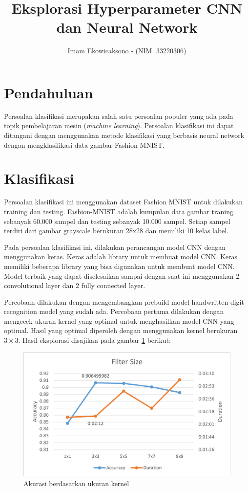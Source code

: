 \documentclass[a4, 12px]{article}
\title{Eksplorasi Hyperparameter CNN dan Neural Network}
\author{Imam Ekowicaksono -
  \small (NIM. 33220306)
}
\date{}
\theoremstyle{definition}
\theoremstyle{remark}
\begin{document}
\maketitle


\section{Pendahuluan}

Persoalan klasifikasi merupakan salah satu persoalan populer yang ada pada topik pembelajaran mesin (\textit{machine learning}). Persoalan klasifikasi ini dapat ditangani dengan menggunakan metode klasifikasi yang berbasis neural network dengan mengklasifikasi data gambar Fashion MNIST. 

\section{Klasifikasi}\label{sec:klasifikasi}

Persoalan klasifikasi ini menggunakan dataset Fashion MNIST untuk dilakukan training dan testing. Fashion-MNIST adalah kumpulan data gambar traning sebanyak 60.000 sampel dan testing sebanyak 10.000 sampel. Setiap sampel terdiri dari gambar grayscale berukuran 28x28 dan memiliki 10 kelas label.

Pada persoalan klasifikasi ini, dilakukan perancangan model CNN dengan menggunakan keras. Keras adalah library untuk membuat model CNN. Keras memiliki beberapa library yang bisa digunakan untuk membuat model CNN. Model terbaik yang dapat diselesaikan sampai dengan saat ini menggunakan 2 convolutional layer dan 2 fully connected layer.

Percobaan dilakukan dengan mengembangkan prebuild model handwritten digit recognition model yang sudah ada. Percobaan pertama dilakukan dengan mengecek ukuran kernel yang optimal untuk menghasilkan model CNN yang optimal. Hasil yang optimal diperoleh dengan menggunakan kernel berukuran $3\times 3$. Hasil eksplorasi disajikan pada gambar \ref{fig:k1} berikut:

\begin{figure}[!h]
	\centering
	\includegraphics[width=0.45\linewidth]{src/K1}
	\caption{Akurasi berdasarkan ukuran kernel}
	\label{fig:k1}
\end{figure}
\end{document}
